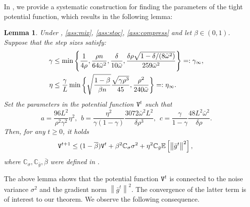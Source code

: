 \documentclass[10pt]{article} %
\theoremstyle{plain}
\newtheorem{lemma}[theorem]{Lemma}
\theoremstyle{definition}
\theoremstyle{remark}
\newcommand{\bw}{\bar{\omega}}
\newcommand{\avgg}{\bar{g}}
\newcommand{\norm}[1]{\left\| #1 \right\|}
\newcommand{\ER}{{\tt V}}
\newcommand{\ConstS}{\mathbb{C}_\sigma}
\newcommand{\ConstG}{\mathbb{C}_{\avgg}}
\newcommand{\brho}{\overline{\beta}}
\newcommand{\redtmp}{}
\begin{document}
In , we provide a systematic construction for finding the parameters of the tight potential function, which results in the following lemma:
\begin{lemma} \label{lem:wholesys}
    Under , \ref{ass:mix}, \ref{ass:stoc}, \ref{ass:compress} and let $\beta \in (0,1)$. 
    Suppose that the step sizes satisfy: 
    \small \begin{align}
        \gamma & \leq \min \left\{ \frac{1}{4 \rho}, \frac{\rho n}{64 \bw^2}, \frac{ \delta}{10 \bw}, \frac{\delta \rho {\redtmp \sqrt{1-\delta/(8 \bw^2)}}}{259 \bw^2} \right\} =: \gamma_\infty , \notag \\
        \eta & \leq \frac{\gamma}{L}  \min \bigg\{
            \sqrt{\frac{1-\beta}{\beta n}}\frac{\sqrt{ \gamma \rho^3} }{45} , \frac{\rho^2}{240 \bw }
        \bigg\} =: \eta_\infty . \label{eq:stepsize_whole}
    \end{align} 
    \normalsize Set the parameters in the potential function $\ER^t$ such that
    \small \begin{equation}
    a = \frac{96L^2}{\rho^2\gamma^2}\eta^2
    , ~~b = \frac{\eta^2}{\gamma(1-\gamma)}\frac{3072\bw^2 L^2}{\delta\rho^3}
    , ~~c = \frac{\gamma}{1-\gamma}\frac{48 L^2\bw^2}{\delta\rho}.
    \end{equation}
    \normalsize Then, for any $t \geq 0$, it holds 
    \begin{align} \label{eq:erbound}
    \hspace{-.1cm} \ER^{t+1} \leq ( 1- \brho ) \ER^t + \beta^2 \ConstS \sigma^2 + \eta^2 \ConstG \mathbb{E} \left[ \norm{\avgg^t}^2 \right],
    \end{align}
    where 
    $\ConstS, \ConstG, \brho$ were defined in .
\end{lemma}
The above lemma shows that the potential function $\ER^t$ is connected to the noise variance $\sigma^2$ and the gradient norm $\norm{\avgg^t}^2$. The convergence of the latter term is of interest to our theorem. We observe the following consequence.
\end{document}
